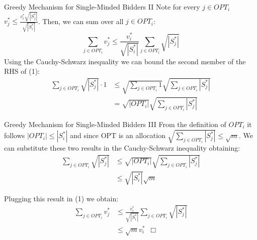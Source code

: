\documentclass[aspectratio=169,xcolor=dvipsnames]{beamer}
\begin{document}
    \begin{frame}{Greedy Mechanism for Single-Minded Bidders II}
    Note for every $j \in OPT_i$  $v^{*}_{j} \leq \frac{v^{*}_{i} \sqrt{|S^{*}_{j}|}  }{\sqrt{|S^{*}_{i}|}}$. Then, we can sum over all $j \in OPT_{i}$:
    \begin{equation}
    \sum_{j \in OPT_{i}}v^{*}_{j} \leq \frac{v^{*}_{i} }{\sqrt{|S^{*}_{i}|}} \sum_{j \in OPT_{i}} \sqrt{|S^{*}_{j}|}
    \end{equation}
\pause
    Using the Cauchy-Schwarz inequality we can bound the second member of the RHS of (1):
    \begin{align*}
        \sum_{j \in OPT_{i}} \sqrt{|S^{*}_{j}|}\cdot 1 &\leq \sqrt{\sum_{j \in OPT_{i}}1} \sqrt{\sum_{j \in OPT_{i}}|S^{*}_{j}| }\\
          &= \sqrt{| OPT_{i}|} \sqrt{\sum_{j \in OPT_{i}}|S^{*}_{j}| }
    \end{align*}
    \end{frame}
    
    \begin{frame}{Greedy Mechanism for Single-Minded Bidders III}
    From the definition of $OPT_{i}$ it follows $|OPT_{i}| \leq |S^{*}_{i}|$ and since OPT is an allocation $\sqrt{\sum_{j \in OPT_{i}} |S^{*}_{j}|} \leq \sqrt{m}$. 
    \pause We can substitute these two results in the Cauchy-Schwarz inequality obtaining:
    \vspace{-5pt}
    \begin{align*}
        \sum_{j \in OPT_{i}} \sqrt{|S^{*}_{j}|} &\leq \sqrt{| OPT_{i}|} \sqrt{\sum_{j \in OPT_{i}}|S^{*}_{j}| }\\
                                                &\leq \sqrt{|S^{*}_{i}|}\sqrt{m}
    \end{align*}
    
\pause
    Plugging this result in (1) we obtain:
    \vspace{-5pt}
    \begin{align*}
    \sum_{j \in OPT_{i}}v^{*}_{j} &\leq \frac{v^{*}_{i} }{\sqrt{|S^{*}_{i}|}} \sum_{j \in OPT_{i}} \sqrt{|S^{*}_{j}|} \\
                                  &\leq  \sqrt{m} v^{*}_{i} \hspace{6pt} \Box 
    \end{align*}
    
    \end{frame}
     
\end{document}
